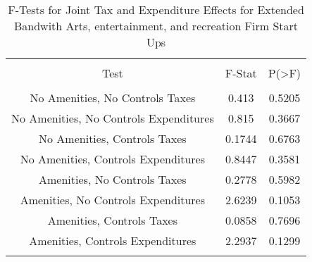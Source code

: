 
\begin{table}[!htbp] \centering 
  \caption{F-Tests for Joint Tax and Expenditure Effects for Extended Bandwith Arts, entertainment, and recreation Firm Start Ups} 
  \label{71Ftests} 
\begin{tabular}{@{\extracolsep{5pt}} ccc} 
\\[-1.8ex]\hline 
\hline \\[-1.8ex] 
Test & F-Stat & P(\textgreater F) \\ 
\hline \\[-1.8ex] 
No Amenities, No Controls Taxes & 0.413 & 0.5205 \\ 
No Amenities, No Controls Expenditures & 0.815 & 0.3667 \\ 
No Amenities, Controls Taxes & 0.1744 & 0.6763 \\ 
No Amenities, Controls Expenditures & 0.8447 & 0.3581 \\ 
Amenities, No Controls Taxes & 0.2778 & 0.5982 \\ 
Amenities, No Controls Expenditures & 2.6239 & 0.1053 \\ 
Amenities, Controls Taxes & 0.0858 & 0.7696 \\ 
Amenities, Controls Expenditures & 2.2937 & 0.1299 \\ 
\hline \\[-1.8ex] 
\end{tabular} 
\end{table} 
